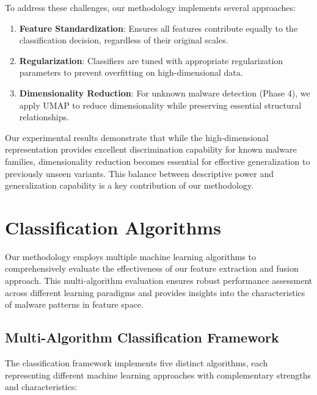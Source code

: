 To address these challenges, our methodology implements several approaches:

\begin{enumerate}
    \item \textbf{Feature Standardization}: Ensures all features contribute equally to the classification decision, regardless of their original scales.
    
    \item \textbf{Regularization}: Classifiers are tuned with appropriate regularization parameters to prevent overfitting on high-dimensional data.
    
    \item \textbf{Dimensionality Reduction}: For unknown malware detection (Phase 4), we apply UMAP to reduce dimensionality while preserving essential structural relationships.
\end{enumerate}

Our experimental results demonstrate that while the high-dimensional representation provides excellent discrimination capability for known malware families, dimensionality reduction becomes essential for effective generalization to previously unseen variants. This balance between descriptive power and generalization capability is a key contribution of our methodology.

\section{Classification Algorithms}
\label{sec:classification-algorithms}

Our methodology employs multiple machine learning algorithms to comprehensively evaluate the effectiveness of our feature extraction and fusion approach. This multi-algorithm evaluation ensures robust performance assessment across different learning paradigms and provides insights into the characteristics of malware patterns in feature space.

\subsection{Multi-Algorithm Classification Framework}
\label{subsec:multi-algorithm}

The classification framework implements five distinct algorithms, each representing different machine learning approaches with complementary strengths and characteristics:

